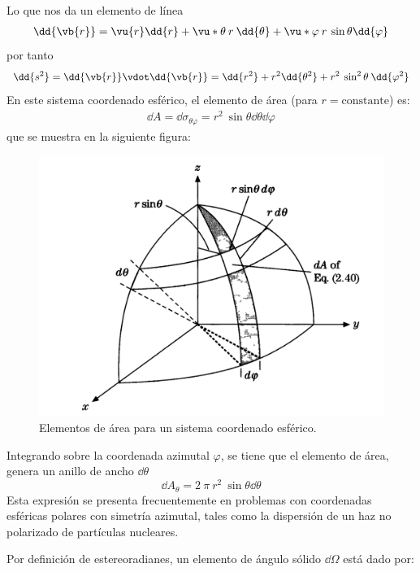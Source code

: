 Lo que nos da un elemento de línea
\begin{align*}
\begin{aligned}
\dd{\vb{r}} = \vu{r} \dd{r} + \vu*{\theta} \: r \: \dd{\theta} + \vu*{\varphi} \: r \: \sin \theta \dd{\varphi}
\end{aligned}
\end{align*}
por tanto
\begin{align*}
\dd{s^{2}} = \dd{\vb{r}} \vdot \dd{\vb{r}} =  \dd{r^{2}} + r^{2} \dd{\theta^{2}} + r^{2} \: \sin^{2} \theta \: \dd{\varphi^{2}}
\end{align*}
En este sistema coordenado esférico, el elemento de área (para $r=\text{constante}$) es:
\begin{align*}
\dd{A} = \dd{\sigma_{\theta \varphi}} = r^{2} \: \sin \theta \dd{\theta} \dd{\varphi}
\end{align*}
que se muestra en la siguiente figura:
\begin{figure}[H]
    \centering
    \includegraphics[scale=0.3]{Imagenes/Elemento_Area_Esferico.png}
    \caption{Elementos de área para un sistema coordenado esférico.}
\end{figure}
Integrando sobre la coordenada azimutal $\varphi$, se tiene que el elemento de área, genera un anillo de ancho $\dd{\theta}$
\[ \dd{A_{\theta}} = 2 \: \pi \: r^{2} \: \sin \theta \dd{\theta} \]
Esta expresión se presenta frecuentemente en problemas con coordenadas esféricas polares con simetría azimutal, tales como la dispersión de un haz no polarizado de partículas nucleares.
\par
Por definición de estereoradianes, un elemento de ángulo sólido $\dd{\Omega}$ está dado por:
